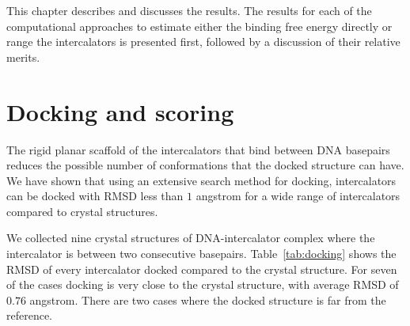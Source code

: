 






This chapter describes and discusses the results. The results for each of the computational approaches to estimate either the binding free energy directly or range the intercalators is presented first, followed by a discussion of their relative merits.


\section{Docking and scoring}




The rigid planar scaffold of the intercalators that bind between DNA basepairs reduces the possible number of conformations that the docked structure can have. We have shown that using an extensive search method for docking, intercalators can be docked with RMSD less than $1$ angstrom for a wide range of intercalators compared to crystal structures.

We collected nine crystal structures of DNA-intercalator complex where the intercalator is between two consecutive basepairs. Table~\ref{tab:docking} shows the RMSD of every intercalator docked compared to the crystal structure. For seven of the cases docking is very close to the crystal structure, with average RMSD of $0.76$ angstrom. There are two cases where the docked structure is far from the reference.

